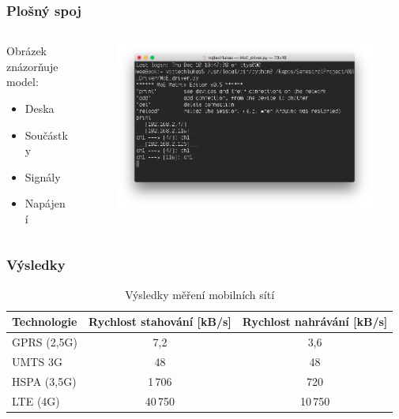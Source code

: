 \documentclass[%
  12pt,       				%
	t,                  %
	aspectratio=1610,   %
	unicode,						%
]{beamer}				    	%
\begin{document}
\begin{frame} 
	\frametitle{Plošný spoj}
	
	\begin{columns}[T] 								%
		\begin{column}{0.4\textwidth}		%
			Obrázek znázorňuje model:\\[2ex]
			\begin{itemize}
				\item Deska
				\item Součástky
				\item Signály
				\item Napájení
			\end{itemize}
		\end{column}
		\begin{column}{0.6\textwidth}		%
			\begin{figure}%
				\centering
				\vspace{1cm}	              %
				\includegraphics[width=0.8\columnwidth]{obrazky/MoE_editor_1.png}
			\end{figure}
		\end{column}
	\end{columns}											%
\end{frame}


\begin{frame} 
	\frametitle{Výsledky}
	\vspace{1cm}
	\begin{table}[]
		\centering
		\caption{Výsledky měření mobilních sítí}
		\label{tab:tabulka}
			\begin{tabular}{lcc}
				\toprule
					Technologie  & Rychlost stahování [kB/s] & Rychlost nahrávání [kB/s] \\
				\midrule
					GPRS (2,5G)	& 7,2 	& 3,6\\
					UMTS 3G     & 48 		& 48\\
					HSPA (3,5G)	&	1\,706	&	720\\
					LTE (4G) 		& 40\,750 & 10\,750\\
				\bottomrule                                       
			\end{tabular}
	\end{table}
\end{frame}
\end{document}
